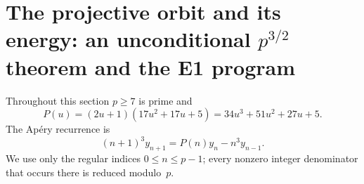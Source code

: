 
\section{The projective orbit and its energy: an unconditional
$p^{3/2}$ theorem and the E1 program}
\label{sec:orbit-energy}

Throughout this section $p\ge7$ is prime and
\[
 P(u)=(2u+1)(17u^2+17u+5)
      =34u^3+51u^2+27u+5.
\]
The Ap\'ery recurrence is
\begin{equation}\label{eq:oe-recurrence}
 (n+1)^3y_{n+1}=P(n)y_n-n^3y_{n-1}.
\end{equation}
We use only the regular indices $0\le n\le p-1$; every nonzero integer
denominator that occurs there is reduced modulo~$p$.

